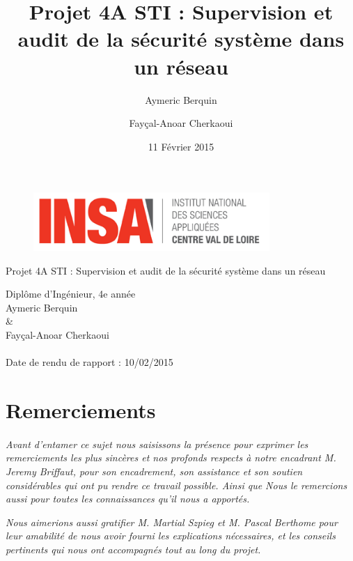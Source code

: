 \documentclass[11pt,a4paper,titlepage, oneside]{article}
\title{Projet 4A STI : Supervision et audit de la sécurité système dans un réseau}
\author{Aymeric Berquin \and Fayçal-Anoar Cherkaoui}
\date{11 Février 2015}
\begin{document}
\begin{titlepage}
 \thispagestyle{empty}
\begin{figure}[h]
  \centering
  \includegraphics[width=0.8\textwidth,natwidth=610,natheight=642]{images/logo.png}
\end{figure}
\vspace{0,5cm}
\begin{center} 
\Huge{\textbf{{\color{red}}}Projet 4A STI : Supervision et audit de la sécurité système dans un réseau}
\\
\vspace{1.5 cm}

\vspace{1cm}
\large{Diplôme d'Ingénieur, 4e année}
\\
\vspace{1cm}
\large{Aymeric Berquin \\ \& \\ Fayçal-Anoar Cherkaoui}
\vspace{1 cm}
\paragraph{}
	\Large{Date de rendu de rapport : 10/02/2015}
	\\
	
\vspace{1.5 cm}
\end{center} 
\end{titlepage} 
\normalsize
\newpage
\section*{\textbf{Remerciements}}
\thispagestyle{empty}
	\paragraph{}
	\begin{large}
	
	\textit{
	Avant d’entamer ce sujet nous saisissons la présence pour exprimer les remerciements les plus sincères et nos profonds respects à notre encadrant M. Jeremy Briffaut, pour son encadrement, son assistance et son soutien considérables qui ont pu rendre ce travail possible. Ainsi que Nous le remercions aussi pour toutes les connaissances qu'il nous a apportés.}
	
\textit{
Nous aimerions aussi gratifier M. Martial Szpieg et M. Pascal Berthome  pour leur amabilité de nous avoir fourni les explications nécessaires, et les conseils pertinents qui nous ont accompagnés tout au long du projet.}\end{large}
\newpage
\end{document}
